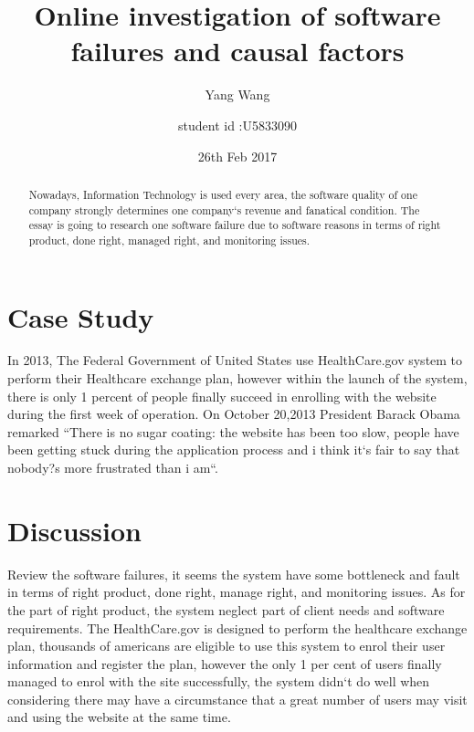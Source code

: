 \documentclass[11pt,twoside,a4paper]{article}
\begin{document}
\title{Online investigation of software failures and causal factors}

\author{Yang Wang}
\author{student id :U5833090}

\date {26th Feb 2017}

\maketitle 

\begin{abstract}

Nowadays, Information Technology is used every area, the software quality of one company strongly determines one company`s revenue and fanatical condition. The essay is going to research one software failure due to software reasons in terms of right product, done right, managed right, and monitoring issues. 
\end{abstract}

\section{Case Study}
\cite{test}
In 2013, The Federal Government of United States use HealthCare.gov system to perform their Healthcare exchange plan, however within the launch of the system,  there is only 1 percent of people finally succeed in enrolling with the website during the first week of operation. On October 20,2013 President Barack Obama remarked ``There is no sugar coating: the website has been too slow, people have been getting stuck during the application process and i think it`s fair to say that nobody?s more frustrated than i am``.


 
\section{Discussion}
Review the software failures, it seems the system have some bottleneck and fault in terms of right product, done right, manage right, and monitoring issues. 
As for the part of right product, the system neglect part of client needs and software requirements. The HealthCare.gov is designed to perform the healthcare exchange plan, thousands of americans are eligible to use this system to enrol their user information and register the plan, however the only 1 per cent of users finally managed to enrol with the site successfully, the system didn`t do well when considering there may have a circumstance that a great number of users may visit and using the website at the same time. 
\end{document}
